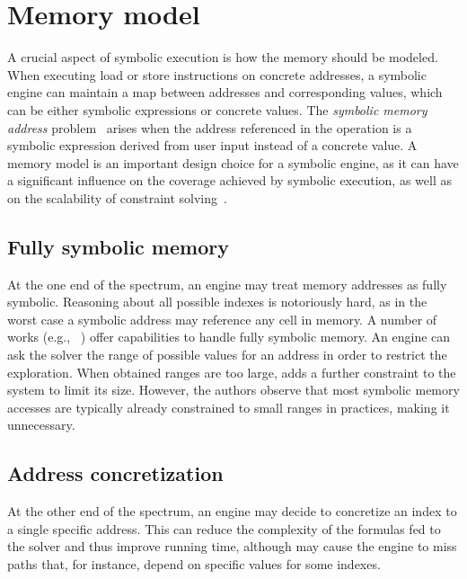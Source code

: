 
\section{Memory model}
\label{memory-model}

A crucial aspect of symbolic execution is how the memory should be modeled. When executing load or store instructions on concrete addresses, a symbolic engine can maintain a map between addresses and corresponding values, which can be either symbolic expressions or concrete values. The {\em symbolic memory address} problem~\cite{SAB-SP10} arises when the address referenced in the operation is a symbolic expression derived from user input instead of a concrete value. A memory model is an important design choice for a symbolic engine, as it can have a significant influence on the coverage achieved by symbolic execution, as well as on the scalability of constraint solving~\cite{CS-CACM13}.

\subsection{Fully symbolic memory}
At the one end of the spectrum, an engine may treat memory addresses as fully symbolic. Reasoning about all possible indexes is notoriously hard, as in the worst case a symbolic address may reference any cell in memory. A number of works (e.g., ~\cite{BITBLAZE-ICISS08,TLL-CAV10,BAP-CAV11,TS-ATVA14}) offer capabilities to handle fully symbolic memory.  An engine can ask the solver the range of possible values for an address in order to restrict the exploration.  When obtained ranges are too large, \cite{BITBLAZE-ICISS08} adds a further constraint to the system to limit its size. However, the authors observe that most symbolic memory accesses are typically already constrained to small ranges in practices, making it unnecessary.

\subsection{Address concretization}
At the other end of the spectrum, an engine may decide to concretize an index to a single specific address. This can reduce the complexity of the formulas fed to the solver and thus improve running time, although may cause the engine to miss paths that, for instance, depend on specific values for some indexes. 

